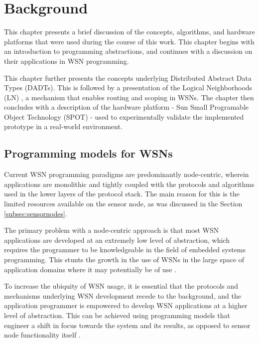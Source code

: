 \chapter{Background} \label{chap:background}

This chapter presents a brief discussion of the concepts, algorithms, and 
hardware platforms that were used during the course of this work. This
chapter begins with an introduction to programming abstractions, and continues
with a discussion on their applications in WSN programming.

This chapter further presents the concepts underlying
Distributed Abstract Data Types (DADTs). This is followed by a presentation of
the Logical Neighborhoods (LN) \cite{mottola_LNScoping:2006}, a mechanism that
enables routing and scoping in WSNs. The chapter then concludes 
with a description of the hardware platform - Sun Small Programable Object
Technology (SPOT) \cite{simon_squawk:2006} - used
to experimentally validate the implemented prototype in a
real-world environment. 

\section {Programming models for WSNs}

Current WSN programming paradigms are predominantly node-centric, wherein
applications are monolithic and tightly coupled with the protocols and algorithms
used in the lower layers of the protocol stack. 
The main reason for this is the limited resources available on the sensor node, as
was discussed in the Section \ref{subsec:sensornodes}.

The primary problem with a node-centric approach is that most WSN applications
are developed at an extremely low level of abstraction, which requires the programmer to be knowledgeable in the field of
embedded systems programming. This stunts the growth in the use of WSNs in the
large space of application domains where it may potentially be of use
\cite{mottola_middleware:2008}. 

To increase the ubiquity of WSN
usage, it is essential that the protocols and mechanisms underlying WSN
development recede to the background, and the application programmer is
empowered to develop WSN applications at a higher level of abstraction. This
can be achieved using programming models that engineer a shift in focus
towards the system and its results, as opposed to sensor node functionality
itself \cite{mottola_middleware:2008}. 

